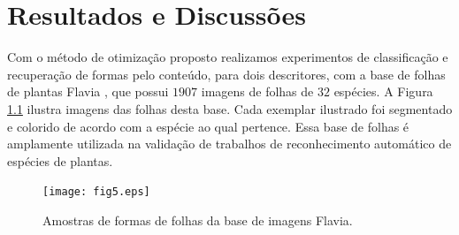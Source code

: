 
\chapter{Resultados e Discussões \label{chap:resultados}}


Com o método de otimização proposto realizamos experimentos de classificação e recuperação de formas pelo conteúdo, para dois descritores, com a base de folhas de plantas Flavia \cite{4458016},  que possui $1907$ imagens de folhas de $32$ espécies. A Figura \ref{fig:bases} ilustra imagens das folhas desta base. Cada exemplar ilustrado foi segmentado e colorido de acordo com a espécie ao qual pertence. Essa base de folhas é amplamente utilizada na validação de trabalhos de reconhecimento automático de espécies de plantas. 

\begin{figure}[!htb]
\caption{\label{fig:bases}Amostras de formas de folhas da base de imagens Flavia.}

\centering
\texttt{[image: fig5.eps]}
\end{figure}





